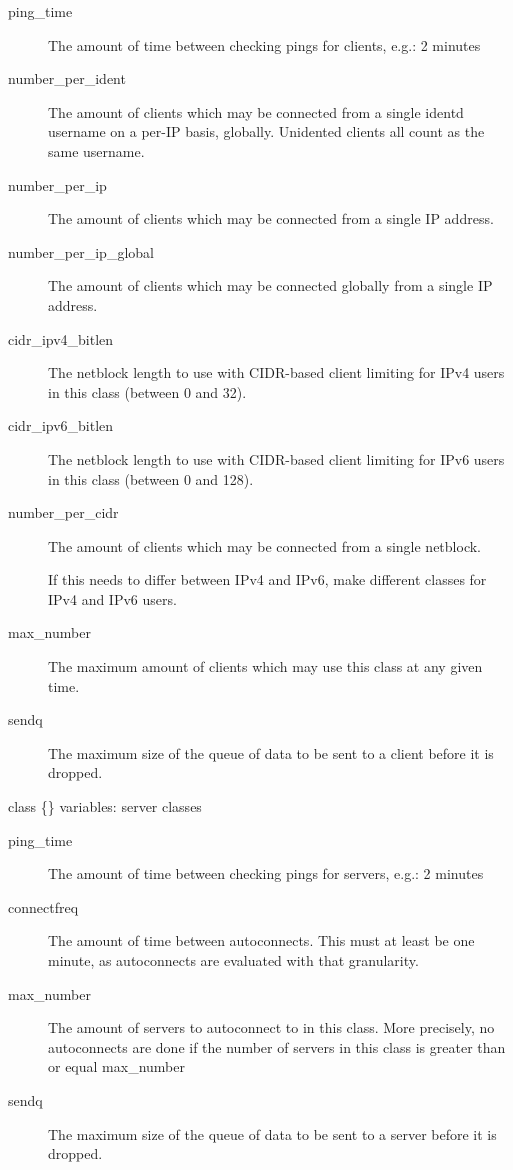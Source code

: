 \noindent
\begin{description}
\item[{ping\_time}]
	The amount of time between checking pings for clients, e.g.: 2 minutes

\item[{number\_per\_ident}]
	The amount of clients which may be connected from a single identd
	username on a per-{}IP basis, globally. Unidented clients all count as
	the same username.

\item[{number\_per\_ip}]
	The amount of clients which may be connected from a single IP address.

\item[{number\_per\_ip\_global}] The amount of clients which may be connected
	globally from a single IP address.

\item[{cidr\_ipv4\_bitlen}]
	The netblock length to use with CIDR-{}based client limiting for IPv4
	users in this class (between 0 and 32).

\item[{cidr\_ipv6\_bitlen}]
	The netblock length to use with CIDR-{}based client limiting for IPv6
	users in this class (between 0 and 128).

\item[{number\_per\_cidr}]
	The amount of clients which may be connected from a single netblock.

	If this needs to differ between IPv4 and IPv6, make different classes
	for IPv4 and IPv6 users.

\item[{max\_number}]
	The maximum amount of clients which may use this class at any given time.

\item[{sendq}]
	The maximum size of the queue of data to be sent to a client before it
	is dropped.
\end{description}

{\sc class \{\} variables: server classes}
\nopagebreak

\noindent
\begin{description}
\item[{ping\_time}] The amount of time between checking pings for servers, e.g.: 2 minutes
\item[{connectfreq}] The amount of time between autoconnects. This must at least be one minute, as autoconnects are evaluated with that granularity.
\item[{max\_number}] The amount of servers to autoconnect to in this class. More precisely, no autoconnects are done if the number of servers in this class is greater than or equal max\_number
\item[{sendq}] The maximum size of the queue of data to be sent to a server before it is dropped.
\end{description}

